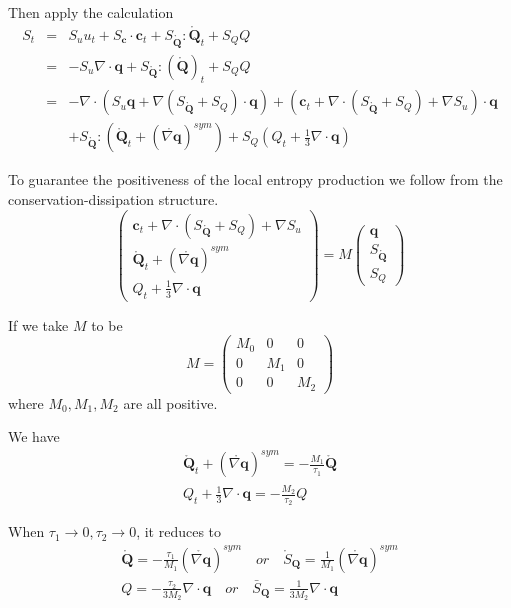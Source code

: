 \documentclass[a4paper]{article}
\begin{document}
Then apply the calculation
\begin{eqnarray}
S_t &=& S_u u_t +S_{\mathbf{c}} \cdot \mathbf{c}_t + S_{\mathring{\mathbf{Q}}}:\mathring{\mathbf{Q}}_t+S_Q Q \\
    &=& -S_u \nabla \cdot \mathbf{q} + S_{\mathring{\mathbf{Q}}}:(\mathring{\mathbf{Q}})_t+S_QQ \\
    &=& -\nabla \cdot (S_u \mathbf{q}+\nabla (S_{\mathring{\mathbf{Q}}}+S_Q) \cdot \mathbf{q})+(\mathbf{c}_t+\nabla \cdot (S_{\mathring{\mathbf{Q}}}+S_Q)+\nabla S_u) \cdot \mathbf{q} \\
&& +S_{\mathring{\mathbf{Q}}}:(\mathring{\mathbf{Q}}_t+(\mathring{\nabla \mathbf{q}})^{sym})+S_Q(Q_t+\frac{1}{3}\nabla \cdot \mathbf{q})
\end{eqnarray}

To guarantee the positiveness of the local entropy production we follow from the conservation-dissipation structure.
\begin{equation}
\left( \begin{array}{ll} \mathbf{c}_t+\nabla \cdot (S_{\mathring{\mathbf{Q}}}+S_Q)+\nabla S_u \\ \mathring{\mathbf{Q}}_t+(\mathring{\nabla \mathbf{q}})^{sym} \\ Q_t+\frac{1}{3} \nabla \cdot \mathbf{q} \end{array} \right) = M \left( \begin{array}{l} \mathbf{q} \\ S_{\mathring{\mathbf{Q}}} \\S_Q \end{array} \right) 
\end{equation}

If we take $M$ to be 
\begin{equation}
M=\left( \begin{array}{lll} M_0 & 0 & 0 \\0 & M_1 & 0 \\0 & 0 & M_2 \end{array} \right)
\end{equation}
where $M_0,M_1,M_2$ are all positive.

We have
\begin{eqnarray}
\mathring{\mathbf{Q}}_t+(\mathring{\nabla \mathbf{q}})^{sym}=-\frac{M_1}{\tau_1}\mathring{\mathbf{Q}} \\
Q_t+\frac{1}{3} \nabla \cdot \mathbf{q}=-\frac{M_2}{\tau_2}Q
\end{eqnarray}

When $\tau_1 \to 0, \tau_2 \to 0$, it reduces to
\begin{eqnarray} 
\mathring{\mathbf{Q}}=-\frac{\tau_1}{M_1}(\mathring{\nabla \mathbf{q}})^{sym} \quad  or \quad \mathring{S}_\mathbf{Q}=\frac{1}{M_1}(\mathring{\nabla \mathbf{q}})^{sym} \\
Q=-\frac{\tau_2}{3M_2}\nabla \cdot \mathbf{q} \quad or \quad \bar{S}_\mathbf{Q}=\frac{1}{3M_2} \nabla \cdot \mathbf{q}
\end{eqnarray}
\end{document}
